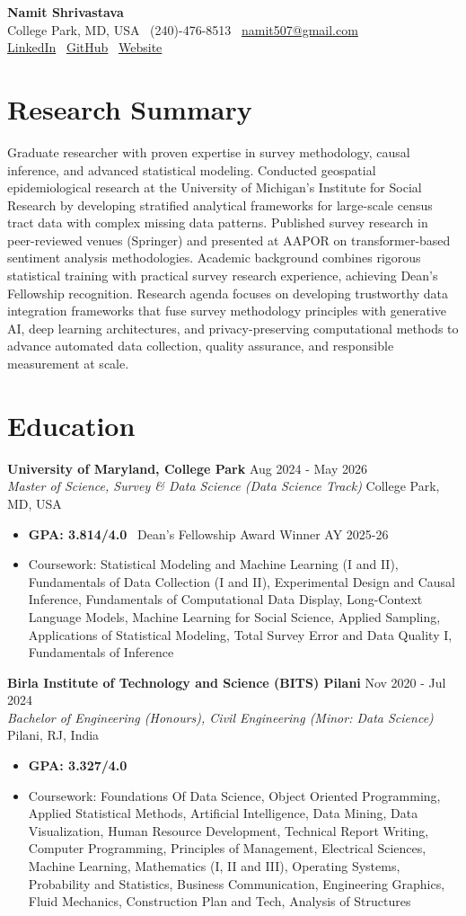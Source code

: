 \documentclass[11pt,letterpaper]{article}
\newcommand{\cvheader}[5]{
    \begin{center}
        {\LARGE\bfseries #1}\\[4pt]
        #2 \textbar\ #3 \textbar\ \href{mailto:#4}{#4}\\[2pt]
        \href{#5}{LinkedIn} \textbar\ \href{https://github.com/namo507/}{GitHub} \textbar\
        \href{https://namo507.github.io/}{Website}
    \end{center}
}
\newcommand{\cvsection}[1]{\section*{#1}}
\newcommand{\cventry}[4]{
    \noindent\textbf{#1} \hfill #2\\
    \textit{#3} \hfill #4\\[4pt]
}
\begin{document}
\cvheader{Namit Shrivastava}{College Park, MD, USA}{(240)-476-8513}{namit507@gmail.com}{https://www.linkedin.com/in/namit-shrivastava-baab47204/}

\vspace{8pt}

\cvsection{Research Summary}

Graduate researcher with proven expertise in survey methodology, causal inference, and advanced statistical modeling. Conducted geospatial epidemiological research at the University of Michigan's Institute for Social Research by developing stratified analytical frameworks for large-scale census tract data with complex missing data patterns. Published survey research in peer-reviewed venues (Springer) and presented at AAPOR on transformer-based sentiment analysis methodologies. Academic background combines rigorous statistical training with practical survey research experience, achieving Dean's Fellowship recognition. Research agenda focuses on developing trustworthy data integration frameworks that fuse survey methodology principles with generative AI, deep learning architectures, and privacy-preserving computational methods to advance automated data collection, quality assurance, and responsible measurement at scale.

\cvsection{Education}

\cventry{University of Maryland, College Park}{Aug 2024 - May 2026}{Master of Science, Survey \& Data Science (Data Science Track)}{College Park, MD, USA}
\begin{itemize}[leftmargin=16pt, noitemsep, topsep=2pt]
    \item \textbf{GPA: 3.814/4.0} \textbar\ Dean's Fellowship Award Winner AY 2025-26
    \item Coursework: Statistical Modeling and Machine Learning (I and II), Fundamentals of Data Collection (I and II), Experimental Design and Causal Inference, Fundamentals of Computational Data Display, Long-Context Language Models, Machine Learning for Social Science, Applied Sampling, Applications of Statistical Modeling, Total Survey Error and Data Quality I, Fundamentals of Inference
\end{itemize}

\cventry{Birla Institute of Technology and Science (BITS) Pilani}{Nov 2020 - Jul 2024}{Bachelor of Engineering (Honours), Civil Engineering (Minor: Data Science)}{Pilani, RJ, India}
\begin{itemize}[leftmargin=16pt, noitemsep, topsep=2pt]
    \item \textbf{GPA: 3.327/4.0}
    \item Coursework: Foundations Of Data Science, Object Oriented Programming, Applied Statistical Methods, Artificial Intelligence, Data Mining, Data Visualization, Human Resource Development, Technical Report Writing, Computer Programming, Principles of Management, Electrical Sciences, Machine Learning, Mathematics (I, II and III), Operating Systems, Probability and Statistics, Business Communication, Engineering Graphics, Fluid Mechanics, Construction Plan and Tech, Analysis of Structures
\end{itemize}
\end{document}
